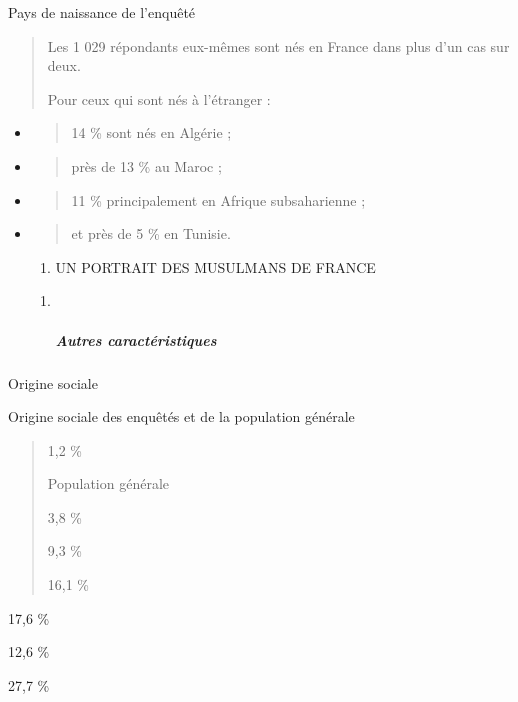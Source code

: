 Pays de naissance de l'enquêté

\begin{quote}
Les 1 029 répondants eux-mêmes sont nés en France dans plus d'un cas sur
deux.

Pour ceux qui sont nés à l'étranger :
\end{quote}

\begin{itemize}
\item
  \begin{quote}
  14 \% sont nés en Algérie ;
  \end{quote}
\item
  \begin{quote}
  près de 13 \% au Maroc ;
  \end{quote}
\item
  \begin{quote}
  11 \% principalement en Afrique subsaharienne ;
  \end{quote}
\item
  \begin{quote}
  et près de 5 \% en Tunisie.
  \end{quote}

  \begin{enumerate}
  \def\labelenumi{\Roman{enumi}.}
  \item
    UN PORTRAIT DES MUSULMANS DE FRANCE
  \end{enumerate}

  \begin{enumerate}
  \def\labelenumi{\arabic{enumi}.}
  \item ~
    \hypertarget{autres-caractuxe9ristiques}{%
    \subparagraph{Autres
    caractéristiques}\label{autres-caractuxe9ristiques}}
  \end{enumerate}
\end{itemize}

Origine sociale

Origine sociale des enquêtés et de la population générale

\begin{quote}
1,2 \%

Population générale

3,8 \%

9,3 \%

16,1 \%
\end{quote}

17,6 \%

12,6 \%

27,7 \%

